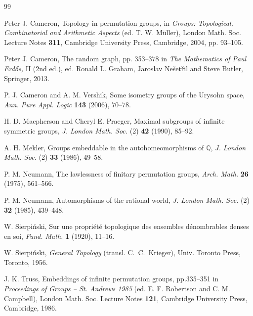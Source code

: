 \documentclass[12pt]{article}
\begin{document}
\begin{thebibliography}{99}

Peter J. Cameron,
Topology in permutation groups,
in \textit{Groups: Topological, Combinatorial and Arithmetic Aspects}
(ed. T. W. M\"uller), London Math. Soc. Lecture Notes \textbf{311},
Cambridge University Press, Cambridge, 2004, pp. 93--105.

Peter J. Cameron,
The random graph,
pp. 353--378 in 
\textit{The Mathematics of Paul Erdős,} II (2nd ed.),
ed. Ronald L. Graham, Jaroslav Nešetřil and Steve Butler, Springer, 2013.

P. J. Cameron and A. M. Vershik,
Some isometry groups of the Urysohn space,
\textit{Ann. Pure Appl. Logic} \textbf{143} (2006), 70--78.

H. D. Macpherson and Cheryl E. Praeger,
Maximal subgroups of infinite symmetric groups,
\textit{J. London Math. Soc.} (2) \textbf{42} (1990), 85--92.

A. H. Mekler,
Groups embeddable in the autohomeomorphisms of $\mathbb{Q}$,
\textit{J. London Math. Soc.} (2) \textbf{33} (1986), 49--58.

P. M. Neumann,
The lawlessness of finitary permutation groups,
\textit{Arch. Math.} \textbf{26} (1975), 561--566.

P. M. Neumann,
Automorphisms of the rational world,
\textit{J. London Math. Soc.} (2) \textbf{32} (1985), 439--448.

W. Sierpi\'nski,
Sur une propri\'et\'e topologique des ensembles d\'enombrables denses en soi,
\textit{Fund. Math.} \textbf{1} (1920), 11--16.

W. Sierpi\'nski,
\textit{General Topology} (transl. C.~C.~Krieger),
Univ. Toronto Press, Toronto, 1956.

J. K. Truss,
Embeddings of infinite permutation groups, pp.335--351 in
\textit{Proceedings of Groups -- St. Andrews 1985}
(ed. E. F. Robertson and C. M. Campbell),
London Math. Soc. Lecture Notes \textbf{121}, Cambridge University Press,
Cambridge, 1986.

\end{thebibliography}
\end{document}
